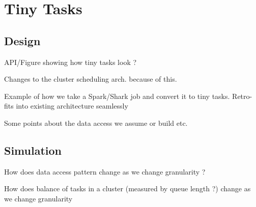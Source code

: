 \section{Tiny Tasks}

\subsection{Design}

\begin{myitemize}
  \item API/Figure showing how tiny tasks look ? 
  \item Changes to the cluster scheduling arch. because of this.
  \item Example of how we take a Spark/Shark job and convert it to tiny tasks.
    Retro-fits into existing architecture seamlessly
  \item Some points about the data access we assume or build etc.
\end{myitemize}

\subsection{Simulation}

\begin{myitemize}
  \item How does data access pattern change as we change granularity ?

  \item How does balance of tasks in a cluster (measured by queue length ?)
    change as we change granularity
\end{myitemize}
